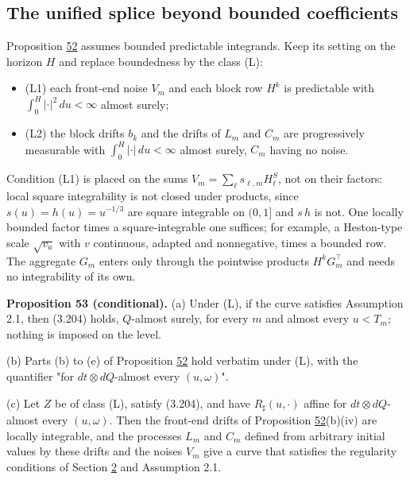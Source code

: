 \documentclass[11pt]{article}
\begin{document}
\subsection{The unified splice beyond bounded coefficients}\label{sec:3.47}

Proposition \hyperref[res:Proposition-52]{52} assumes bounded predictable integrands. Keep its setting on the horizon \(H\) and replace boundedness by the class (L):

\begin{itemize}
  \item (L1) each front-end noise \(V_m\) and each block row \(H^k\) is predictable with \(\int_0^H|\cdot|^2\,du<\infty\) almost surely;
  \item (L2) the block drifts \(b_k\) and the drifts of \(L_m\) and \(C_m\) are progressively measurable with \(\int_0^H|\cdot|\,du<\infty\) almost surely, \(C_m\) having no noise.
\end{itemize}

Condition (L1) is placed on the sums \(V_m=\sum_\ell s_{\ell,m}H^S_\ell\), not on their factors: local square integrability is not closed under products, since \(s(u)=h(u)=u^{-1/3}\) are square integrable on \((0,1]\) and \(s\,h\) is not. One locally bounded factor times a square-integrable one suffices; for example, a Heston-type scale \(\sqrt{v_u}\) with \(v\) continuous, adapted and nonnegative, times a bounded row. The aggregate \(G_m\) enters only through the pointwise products \(H^kG_m^\top\) and needs no integrability of its own.

\label{res:Proposition-53}
\textbf{Proposition 53 (conditional).} (a) Under (L), if the curve satisfies Assumption 2.1, then (3.204) holds, \(Q\)-almost surely, for every \(m\) and almost every \(u<T_m\); nothing is imposed on the level.

(b) Parts (b) to (e) of Proposition \hyperref[res:Proposition-52]{52} hold verbatim under (L), with the quantifier "for \(dt\otimes dQ\)-almost every \((u,\omega)\)".

(c) Let \(Z\) be of class (L), satisfy (3.204), and have \(R_\sharp(u,\cdot)\) affine for \(dt\otimes dQ\)-almost every \((u,\omega)\). Then the front-end drifts of Proposition \hyperref[res:Proposition-52]{52}(b)(iv) are locally integrable, and the processes \(L_m\) and \(C_m\) defined from arbitrary initial values by these drifts and the noises \(V_m\) give a curve that satisfies the regularity conditions of Section \hyperref[sec:2]{2} and Assumption 2.1.
\end{document}
